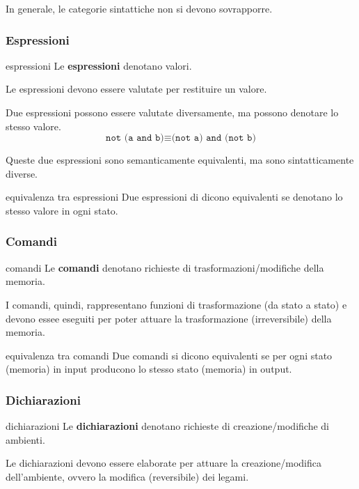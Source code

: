 In generale, le categorie sintattiche non si devono sovrapporre.

\subsubsection{Espressioni}
\begin{mydef}{espressioni}
    Le \textbf{espressioni} denotano valori.
\end{mydef}

Le espressioni devono essere valutate per restituire un valore.

\smallskip
Due espressioni possono essere valutate diversamente, ma possono denotare lo stesso valore.
\[
    \texttt{not (a and b)} \equiv \texttt{(not a) and (not b)}
\]

Queste due espressioni sono semanticamente equivalenti, ma sono sintatticamente diverse.

\begin{mydef}{equivalenza tra espressioni}
    Due espressioni di dicono equivalenti se denotano lo stesso valore in ogni stato.
\end{mydef}

\subsubsection{Comandi}
\begin{mydef}{comandi}
    Le \textbf{comandi} denotano richieste di trasformazioni/modifiche della memoria.
\end{mydef}

I comandi, quindi, rappresentano funzioni di trasformazione (da stato a stato) e devono essee eseguiti per poter attuare la trasformazione (irreversibile) della memoria.

\begin{mydef}{equivalenza tra comandi}
    Due comandi si dicono equivalenti se per ogni stato (memoria) in input producono lo stesso stato (memoria) in output.
\end{mydef}

\subsubsection{Dichiarazioni}
\begin{mydef}{dichiarazioni}
    Le \textbf{dichiarazioni} denotano richieste di creazione/modifiche di ambienti.
\end{mydef}

Le dichiarazioni devono essere elaborate per attuare la creazione/modifica dell'ambiente, ovvero la modifica (reversibile) dei legami.

